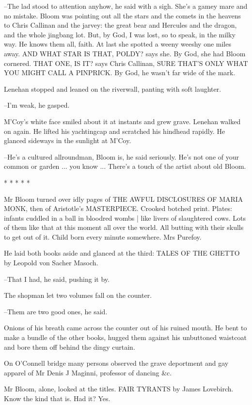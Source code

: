 --The lad stood to attention anyhow,
he said with a sigh.
She's a gamey
mare and no mistake.
Bloom was pointing out all the stars and the comets
in the heavens
to Chris Callinan and the jarvey:
the great bear and
Hercules and the dragon,
and the whole jingbang lot.
But, by God, I was
lost,
so to speak,
in the milky way.
He knows them all, faith.
At last she
spotted a weeny weeshy one miles away.
AND WHAT STAR IS THAT, POLDY?
says
she.
By God, she had Bloom cornered.
THAT ONE, IS IT?
says Chris Callinan,
SURE THAT'S ONLY WHAT YOU MIGHT CALL A PINPRICK.
By God, he wasn't far
wide of the mark.

Lenehan stopped and leaned on the riverwall,
panting with soft
laughter.

--I'm weak,
he gasped.

M'Coy's white face smiled about it at instants
and grew grave.
Lenehan walked on again.
He lifted his yachtingcap and scratched his
hindhead rapidly.
He glanced sideways in the sunlight at M'Coy.

--He's a cultured allroundman,
Bloom is,
he said seriously.
He's not one
of your common or garden ...
you know ...
There's a touch of the artist
about old Bloom.


    * * * * *


Mr Bloom turned over idly pages
of THE AWFUL DISCLOSURES OF MARIA MONK,
then of Aristotle's MASTERPIECE.
Crooked botched print.
Plates:
infants cuddled in a ball in bloodred wombs |
like livers of slaughtered cows.
Lots of them like that at this moment all over the world.
All butting with their skulls to get out of it.
Child born every minute
somewhere.
Mrs Purefoy.%

He laid both books aside and glanced at the third:
TALES OF THE GHETTO
by Leopold von Sacher Masoch.

--That I had, he said, pushing it by.

The shopman let two volumes fall on the counter.

--Them are two good ones,
he said.

Onions of his breath came across the counter
out of his ruined
mouth.
He bent to make a bundle of the other books,
hugged them against
his unbuttoned waistcoat
and bore them off behind the dingy curtain.

On O'Connell bridge
many persons observed the grave deportment
and gay apparel of Mr Denis J Maginni,
professor of dancing \&c.

Mr Bloom, alone,
looked at the titles.
FAIR TYRANTS by James Lovebirch.
Know the kind that is.
Had it?
Yes.

